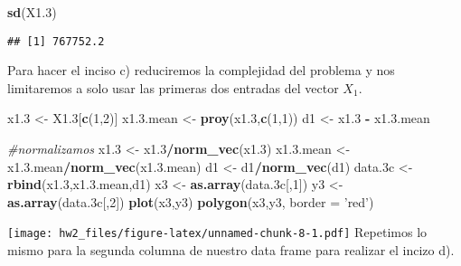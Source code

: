 \documentclass[]{article}
\newenvironment{Shaded}{\begin{snugshade}}{\end{snugshade}}
\newcommand{\CommentTok}[1]{\textcolor[rgb]{0.56,0.35,0.01}{\textit{#1}}}
\newcommand{\DataTypeTok}[1]{\textcolor[rgb]{0.13,0.29,0.53}{#1}}
\newcommand{\DecValTok}[1]{\textcolor[rgb]{0.00,0.00,0.81}{#1}}
\newcommand{\FloatTok}[1]{\textcolor[rgb]{0.00,0.00,0.81}{#1}}
\newcommand{\KeywordTok}[1]{\textcolor[rgb]{0.13,0.29,0.53}{\textbf{#1}}}
\newcommand{\NormalTok}[1]{#1}
\newcommand{\OperatorTok}[1]{\textcolor[rgb]{0.81,0.36,0.00}{\textbf{#1}}}
\newcommand{\StringTok}[1]{\textcolor[rgb]{0.31,0.60,0.02}{#1}}
\begin{document}
\begin{Shaded}
\begin{Highlighting}[]
\KeywordTok{sd}\NormalTok{(X1}\FloatTok{.3}\NormalTok{)}
\end{Highlighting}
\end{Shaded}

\begin{verbatim}
## [1] 767752.2
\end{verbatim}

Para hacer el inciso c) reduciremos la complejidad del problema y nos
limitaremos a solo usar las primeras dos entradas del vector \(X_1\).

\begin{Shaded}
\begin{Highlighting}[]
\NormalTok{x1}\FloatTok{.3}\NormalTok{ <-}\StringTok{ }\NormalTok{X1}\FloatTok{.3}\NormalTok{[}\KeywordTok{c}\NormalTok{(}\DecValTok{1}\NormalTok{,}\DecValTok{2}\NormalTok{)]}
\NormalTok{x1.}\FloatTok{3.}\NormalTok{mean <-}\StringTok{ }\KeywordTok{proy}\NormalTok{(x1}\FloatTok{.3}\NormalTok{,}\KeywordTok{c}\NormalTok{(}\DecValTok{1}\NormalTok{,}\DecValTok{1}\NormalTok{))}
\NormalTok{d1 <-}\StringTok{ }\NormalTok{x1}\FloatTok{.3} \OperatorTok{-}\StringTok{ }\NormalTok{x1.}\FloatTok{3.}\NormalTok{mean}

\CommentTok{#normalizamos}
\NormalTok{x1}\FloatTok{.3}\NormalTok{ <-}\StringTok{ }\NormalTok{x1}\FloatTok{.3}\OperatorTok{/}\KeywordTok{norm_vec}\NormalTok{(x1}\FloatTok{.3}\NormalTok{)}
\NormalTok{x1.}\FloatTok{3.}\NormalTok{mean <-}\StringTok{ }\NormalTok{x1.}\FloatTok{3.}\NormalTok{mean}\OperatorTok{/}\KeywordTok{norm_vec}\NormalTok{(x1.}\FloatTok{3.}\NormalTok{mean)}
\NormalTok{d1 <-}\StringTok{ }\NormalTok{d1}\OperatorTok{/}\KeywordTok{norm_vec}\NormalTok{(d1)}
\NormalTok{data}\FloatTok{.3}\NormalTok{c <-}\KeywordTok{rbind}\NormalTok{(x1}\FloatTok{.3}\NormalTok{,x1.}\FloatTok{3.}\NormalTok{mean,d1)}
\NormalTok{x3 <-}\StringTok{ }\KeywordTok{as.array}\NormalTok{(data}\FloatTok{.3}\NormalTok{c[,}\DecValTok{1}\NormalTok{])}
\NormalTok{y3 <-}\StringTok{ }\KeywordTok{as.array}\NormalTok{(data}\FloatTok{.3}\NormalTok{c[,}\DecValTok{2}\NormalTok{])}
\KeywordTok{plot}\NormalTok{(x3,y3)}
\KeywordTok{polygon}\NormalTok{(x3,y3, }\DataTypeTok{border =} \StringTok{'red'}\NormalTok{)}
\end{Highlighting}
\end{Shaded}

\texttt{[image: hw2\_files/figure-latex/unnamed-chunk-8-1.pdf]} Repetimos
lo mismo para la segunda columna de nuestro data frame para realizar el
incizo d).
\end{document}

